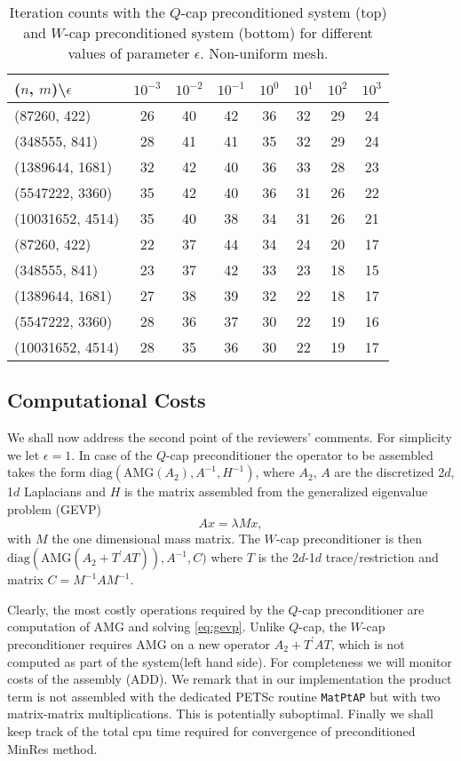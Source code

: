 \documentclass[10pt, a4paper]{article}
\newcommand{\dual}[1]{\ensuremath{{#1}^{\prime}}}
\begin{document}
\begin{table}[ht]
  \caption{Iteration counts with the $Q$-cap preconditioned system (top) and $W$-cap 
  preconditioned system (bottom) for different values of parameter $\epsilon$. 
  Non-uniform mesh.
}
\label{tab:iter_nonunif}
\footnotesize{
\begin{tabular}{l|ccccccc}
\hline
($n$, $m$)\textbackslash $\epsilon$ & $10^{-3}$ & $10^{-2}$ & $10^{-1}$ & $10^{0}$ & $10^{1}$ & $10^{2}$ & $10^{3}$\\
\hline
(87260, 422) & 26 & 40 & 42 & 36 & 32 & 29 & 24\\
(348555, 841) & 28 & 41 & 41 & 35 & 32 & 29 & 24\\
(1389644, 1681) & 32 & 42 & 40 & 36 & 33 & 28 & 23\\
(5547222, 3360) & 35 & 42 & 40 & 36 & 31 & 26 & 22\\
(10031652, 4514) & 35 & 40 & 38 & 34 & 31 & 26 & 21\\
\hline
\hline
(87260, 422) & 22 & 37 & 44 & 34 & 24 & 20 & 17\\
(348555, 841) & 23 & 37 & 42 & 33 & 23 & 18 & 15\\
(1389644, 1681) & 27 & 38 & 39 & 32 & 22 & 18 & 17\\
(5547222, 3360) & 28 & 36 & 37 & 30 & 22 & 19 & 16\\
(10031652, 4514) & 28 & 35 & 36 & 30 & 22 & 19 & 17\\
\hline
\end{tabular}
}
\end{table}

\subsection*{Computational Costs} We shall now address the second point of the 
reviewers' comments. For simplicity we let $\epsilon=1$. In case of the $Q$-cap 
preconditioner the operator to be assembled takes the form
$\text{diag}(\text{AMG}(A_2), A^{-1}, H^{-1})$, 
where $A_2$, $A$ are the discretized 2$d$, 1$d$ Laplacians and $H$ is the matrix 
assembled from the generalized eigenvalue problem (GEVP)
%
\begin{equation}\label{eq:gevp}
  Ax=\lambda M x,
\end{equation}
%
with $M$ the one dimensional mass matrix. The $W$-cap preconditioner is then 
$\text{diag}(\text{AMG}(A_2+\dual{T}AT)), A^{-1}, C)$  where $T$ is the 2$d$-1$d$ 
trace/restriction and matrix $C=M^{-1}AM^{-1}$. 

Clearly, the most costly operations required by the $Q$-cap preconditioner are
computation of AMG and solving \eqref{eq:gevp}. Unlike
$Q$-cap, the $W$-cap preconditioner requires AMG on a new operator
$A_2+\dual{T}AT$, which is not computed as part of the system(left hand side). 
For completeness we will monitor costs of the assembly (ADD). We remark that in our
implementation the product term is not assembled with the dedicated PETSc
routine \texttt{MatPtAP} but with two matrix-matrix multiplications. This is
potentially suboptimal. Finally we shall keep track of the total cpu time
required for convergence of preconditioned MinRes method.
\end{document}
